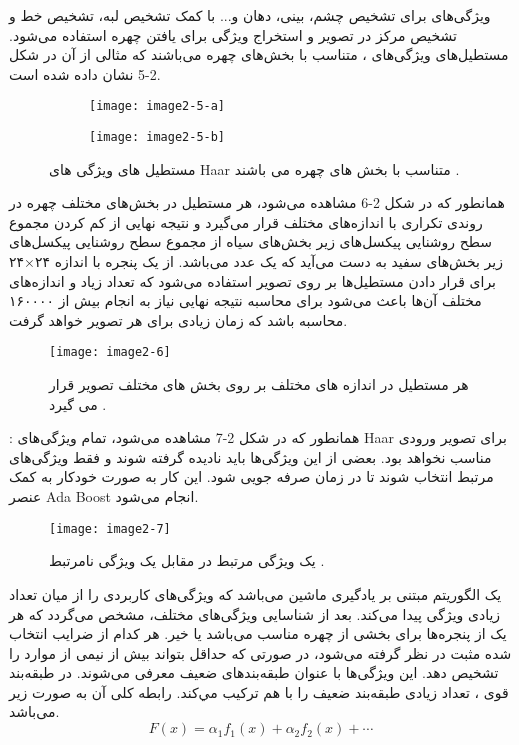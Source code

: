 \noindent
ویژگی‌های‌  برای تشخیص چشم، بینی، دهان و... با کمک تشخیص لبه، تشخیص خط و تشخیص مرکز در تصویر و استخراج ویژگی برای یافتن چهره استفاده می‌شود. مستطیل‌های ویژگی‌های ، متناسب با بخش‌های چهره می‌باشند که مثالی از آن در شکل 2-5 نشان داده شده است.

\begin{figure}
\begin{subfigure}{.5\textwidth}
  \centering
  \texttt{[image: image2-5-a]}
  \label{image2-5-a}
\end{subfigure}
\begin{subfigure}{.5\textwidth}
  \centering
  \texttt{[image: image2-5-b]}
  \label{image2-5-b}
\end{subfigure}
\caption{مستطیل های ویژگی های Haar متناسب با بخش های چهره می باشند \cite{ref1}.}
\label{fig:image2-5}
\end{figure}

\noindent
همانطور که در شکل 2-6 مشاهده می‌شود، هر مستطیل در بخش‌های مختلف چهره در روندی تکراری با اندازه‌های مختلف قرار می‌گیرد و نتیجه نهایی از کم کردن مجموع سطح روشنایی پیکسل‌های زیر بخش‌های سیاه از مجموع سطح روشنایی پیکسل‌های زیر بخش‌های سفید به دست می‌آید که یک عدد می‌باشد. از یک پنجره با اندازه ۲۴×۲۴ برای قرار دادن مستطیل‌ها بر روی تصویر استفاده می‌شود که تعداد زیاد و اندازه‌های مختلف آن‌ها باعث می‌شود برای محاسبه نتیجه نهایی نیاز به انجام بیش از ۱۶۰۰۰۰ محاسبه باشد که زمان زیادی برای هر تصویر خواهد گرفت.

\begin{figure}[h]
\centering
  \texttt{[image: image2-6]}
  \caption{هر مستطیل در اندازه های مختلف بر روی بخش های مختلف تصویر قرار می گیرد \cite{ref1}.}
  \label{image2-6}
\end{figure}

\noindent
{}: 
همانطور که در شکل 2-7 مشاهده می‌شود، تمام ویژگی‌های Haar برای تصویر ورودی مناسب نخواهد بود. بعضی از این ویژگی‌ها باید نادیده گرفته شوند و فقط ویژگی‌های مرتبط انتخاب شوند تا در زمان صرفه جویی شود. این کار به صورت خودکار به کمک عنصر Ada Boost انجام می‌شود.
\begin{figure}[h]
\centering
  \texttt{[image: image2-7]}
  \caption{یک ویژگی مرتبط در مقابل یک ویژگی نامرتبط \cite{ref1}.}
  \label{image2-7}
\end{figure}

\noindent
{} 
یک الگوریتم مبتنی بر یادگیری ماشین می‌باشد که ویژگی‌های کاربردی را از میان تعداد زیادی ویژگی پیدا می‌کند. بعد از شناسایی ویژگی‌های مختلف، مشخص می‌گردد که هر یک از پنجره‌ها برای بخشی از چهره مناسب می‌باشد یا خیر. هر کدام از ضرایب انتخاب شده مثبت در نظر گرفته می‌شود، در صورتی که حداقل بتواند بیش از نیمی از موارد را تشخیص دهد. این ویژگی‌ها با عنوان طبقه‌بندهای ضعیف
 معرفی می‌شوند. 
در طبقه‌بند قوی ، تعداد زيادی طبقه‌بند ضعيف را با هم ترکيب مي‌کند. رابطه کلی آن به صورت زیر می‌باشد.
\begin{equation}\label{eq2-5}
F(x)=α_1 f_1 (x)+α_2 f_2 (x)+⋯
\end{equation}

